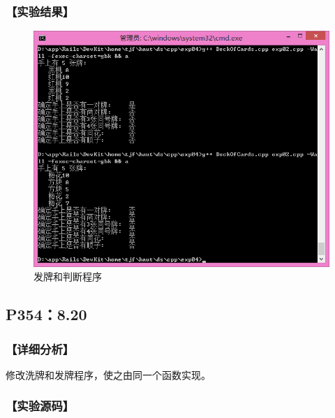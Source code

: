 \subsubsection*{【实验结果】}
\begin{figure}[htp]
\centering
\includegraphics[width=\textwidth]{exp04/exp02.png}
\caption{\label{out04_02}发牌和判断程序}
\end{figure}

\subsection{P354：8.20}
\subsubsection*{【详细分析】}
修改洗牌和发牌程序，使之由同一个函数实现。
\subsubsection*{【实验源码】}
{\linespread{1}}
{\linespread{1}}
